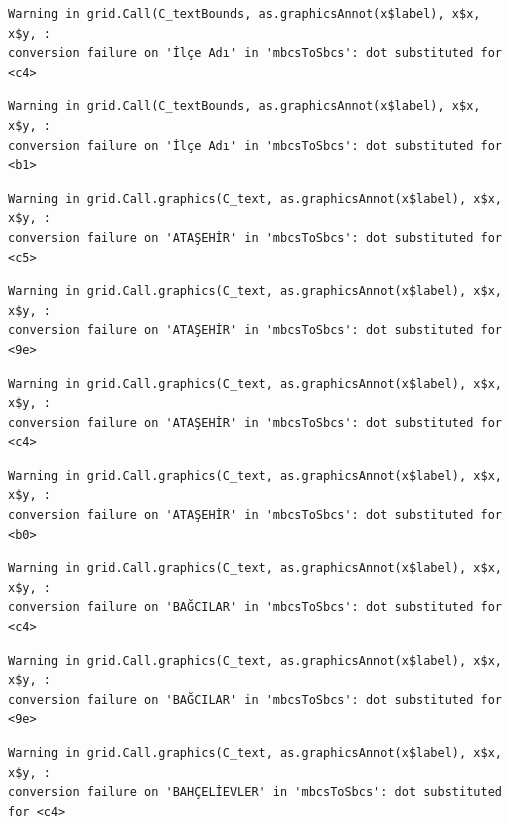 \documentclass[
  11pt,
  a4paper,
  DIV=11,
  numbers=noendperiod]{scrartcl}
\begin{document}
\begin{verbatim}
Warning in grid.Call(C_textBounds, as.graphicsAnnot(x$label), x$x, x$y, :
conversion failure on 'İlçe Adı' in 'mbcsToSbcs': dot substituted for <c4>
\end{verbatim}

\begin{verbatim}
Warning in grid.Call(C_textBounds, as.graphicsAnnot(x$label), x$x, x$y, :
conversion failure on 'İlçe Adı' in 'mbcsToSbcs': dot substituted for <b1>
\end{verbatim}

\begin{verbatim}
Warning in grid.Call.graphics(C_text, as.graphicsAnnot(x$label), x$x, x$y, :
conversion failure on 'ATAŞEHİR' in 'mbcsToSbcs': dot substituted for <c5>
\end{verbatim}

\begin{verbatim}
Warning in grid.Call.graphics(C_text, as.graphicsAnnot(x$label), x$x, x$y, :
conversion failure on 'ATAŞEHİR' in 'mbcsToSbcs': dot substituted for <9e>
\end{verbatim}

\begin{verbatim}
Warning in grid.Call.graphics(C_text, as.graphicsAnnot(x$label), x$x, x$y, :
conversion failure on 'ATAŞEHİR' in 'mbcsToSbcs': dot substituted for <c4>
\end{verbatim}

\begin{verbatim}
Warning in grid.Call.graphics(C_text, as.graphicsAnnot(x$label), x$x, x$y, :
conversion failure on 'ATAŞEHİR' in 'mbcsToSbcs': dot substituted for <b0>
\end{verbatim}

\begin{verbatim}
Warning in grid.Call.graphics(C_text, as.graphicsAnnot(x$label), x$x, x$y, :
conversion failure on 'BAĞCILAR' in 'mbcsToSbcs': dot substituted for <c4>
\end{verbatim}

\begin{verbatim}
Warning in grid.Call.graphics(C_text, as.graphicsAnnot(x$label), x$x, x$y, :
conversion failure on 'BAĞCILAR' in 'mbcsToSbcs': dot substituted for <9e>
\end{verbatim}

\begin{verbatim}
Warning in grid.Call.graphics(C_text, as.graphicsAnnot(x$label), x$x, x$y, :
conversion failure on 'BAHÇELİEVLER' in 'mbcsToSbcs': dot substituted for <c4>
\end{verbatim}
\end{document}
